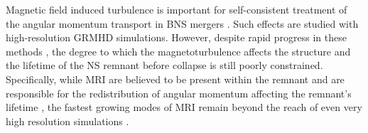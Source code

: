 
%
Magnetic field induced turbulence is important for 
self-consistent treatment of the angular momentum transport in 
\ac{BNS} mergers \citep{Duez:2006qe,Kiuchi:2014hja,Guilet:2016sqd,Kiuchi:2017zzg}. 
%
Such effects are studied with high-resolution \ac{GRMHD} simulations. 
However, despite rapid progress in these methods 
\citep[\eg][]{Rezzolla:2011da,Kiuchi:2014hja,Ruiz:2016rai},
the degree to which the magnetoturbulence affects the structure and the 
lifetime of the \pmerg{} \ac{NS} remnant before collapse is still poorly constrained.
%
Specifically, while \ac{MRI} are believed to be present within the 
remnant and are responsible for the redistribution of angular 
momentum affecting the remnant's lifetime 
\citep[\eg][]{Duez:2006qe,Siegel:2013nrw}, 
the fastest growing modes of \ac{MRI} remain beyond the 
reach of even very high resolution simulations \citep[\eg][]{Kiuchi:2014hja}.
%
%
%

